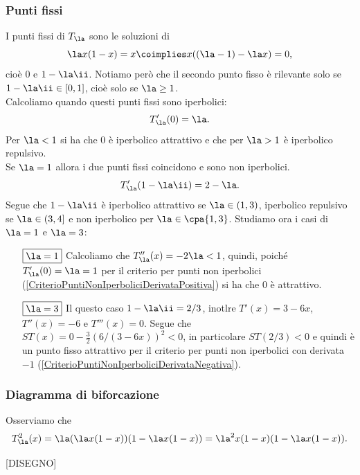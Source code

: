 \subsubsection{Punti fissi}
I punti fissi di $T_\la$ sono le soluzioni di
\[\la x(1-x)=x\coimplies x((\la-1)-\la x)=0,\]
cio\`e $0$ e $1-\la\ii$. Notiamo per\`o che il secondo punto fisso \`e rilevante solo se $1-\la\ii\in [0,1]$, cio\`e solo se $\la\geq 1$.\\
Calcoliamo quando questi punti fissi sono iperbolici:
\[T'_\la(0)=\la.\]
Per $\la<1$ si ha che $0$ \`e iperbolico attrattivo e che per $\la>1$ \`e iperbolico repulsivo.\\
Se $\la=1$ allora i due punti fissi coincidono e sono non iperbolici.
\[T'_\la(1-\la\ii)=2-\la.\]
Segue che $1-\la\ii$ \`e iperbolico attrattivo se $\la\in (1,3)$, iperbolico repulsivo se $\la\in (3,4]$ e non iperbolico per $\la\in\cpa{1,3}$.
Studiamo ora i casi di $\la=1$ e $\la=3$:
\setlength{\leftmargini}{0cm}
\begin{itemize}
\item[$\boxed{\la=1}$] Calcoliamo che $T_\la''(x)=-2\la<1$, quindi, poich\'e $T_\la'(0)=\la=1$ per il criterio per punti non iperbolici (\ref{CriterioPuntiNonIperboliciDerivataPositiva}) si ha che $0$ \`e attrattivo.
\item[$\boxed{\la=3}$] Il questo caso $1-\la\ii=2/3$, inotlre $T'(x)=3-6x$, $T''(x)=-6$ e $T'''(x)=0$. Segue che $ST(x)=0-\frac32(6/(3-6x))^2<0$, in particolare $ST(2/3)<0$ e quindi \`e un punto fisso attrattivo per il criterio per punti non iperbolici con derivata $-1$ (\ref{CriterioPuntiNonIperboliciDerivataNegativa}).
\end{itemize}
\setlength{\leftmargini}{0.5cm}
\subsubsection{Diagramma di biforcazione}
Osserviamo che 
\[T_\la^2(x)=\la(\la x(1-x))(1-\la x(1-x))=\la^2 x(1-x)(1-\la x(1-x)).\]

[DISEGNO]

